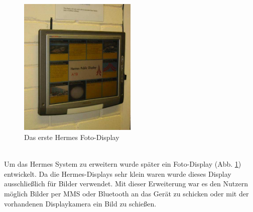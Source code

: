 \begin{figure}[h!]
  \centering
  \includegraphics[width=0.5\textwidth]{./img/hermes_photoDisplay_short.png}
  \caption{Das erste Hermes Foto-Display\cite{cheverest:2012}}
  \label{img:hermesPhotoDisplay}
\end{figure}
\\
Um das Hermes System zu erweitern wurde später ein Foto-Display (Abb. \ref{img:hermesPhotoDisplay}) entwickelt\cite{cheveres:2005:hermes-bluetooth}. Da die Hermes-Displays sehr klein waren wurde dieses Display ausschließlich für Bilder verwendet.
Mit dieser Erweiterung war es den Nutzern möglich Bilder per MMS oder Bluetooth an das Gerät zu schicken oder mit der vorhandenen Displaykamera ein Bild zu schießen.
\\


